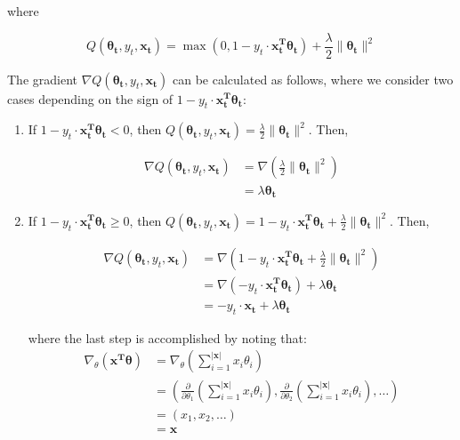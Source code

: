 \documentclass{article}
\renewcommand{\vec}[1]{\boldsymbol{#1}}
\newcommand{\pd}[2]{\frac{\partial#1}{\partial#2}}
\begin{document}
\begin{enumerate}[(a)]
where

\begin{equation}
Q(\vec{\theta_{t}}, y_t, \vec{x_t}) = \max(0, 1-y_t\cdot\vec{x_t^{T}}\vec{\theta_t}) + \frac{\lambda}{2}\|\vec{\theta_t}\|^2
\end{equation}

The gradient $\nabla Q(\vec{\theta_{t}}, y_t, \vec{x_t})$ can be calculated as follows, where we consider two cases depending on the sign of $1-y_t\cdot\vec{x_t^{T}}\vec{\theta_t}$:

\begin{enumerate}[1.]
\item If $1-y_t\cdot\vec{x_t^{T}}\vec{\theta_t} < 0$, then $Q(\vec{\theta_{t}}, y_t, \vec{x_t}) = \frac{\lambda}{2}\|\vec{\theta_t}\|^2$. Then,

\begin{align*}
\nabla Q(\vec{\theta_{t}}, y_t, \vec{x_t}) &= \nabla\left(\frac{\lambda}{2}\|\vec{\theta_t}\|^2\right)\\
&= \lambda \vec{\theta_t}
\end{align*}

\item If $1-y_t\cdot\vec{x_t^{T}}\vec{\theta_t} \geq 0$, then $Q(\vec{\theta_{t}}, y_t, \vec{x_t}) = 1-y_t\cdot\vec{x_t^{T}}\vec{\theta_t}+\frac{\lambda}{2}\|\vec{\theta_t}\|^2$. Then,

\begin{align*}
\nabla Q(\vec{\theta_{t}}, y_t, \vec{x_t}) &= \nabla\left(1-y_t\cdot\vec{x_t^{T}}\vec{\theta_t}+\frac{\lambda}{2}\|\vec{\theta_t}\|^2\right)\\
&= \nabla\left( -y_t\cdot\vec{x_t^{T}}\vec{\theta_t} \right) + \lambda \vec{\theta_t}\\
&= -y_t\cdot\vec{x_t} + \lambda\vec{\theta_t}
\end{align*}

where the last step is accomplished by noting that:
\begin{align*}
\nabla_{\theta}\left(\vec{x^{T}}\vec{\theta}\right) &= \nabla_{\theta}\left(\sum_{i=1}^{|\vec{x}|} x_i\theta_i\right)\\
&= \left( \pd{}{\theta_1}\left(\sum_{i=1}^{|\vec{x}|} x_i\theta_i\right), \pd{}{\theta_2}\left(\sum_{i=1}^{|\vec{x}|} x_i\theta_i\right), \ldots \right)\\
&= \left( x_1, x_2, \ldots \right)\\
&= \vec{x}
\end{align*}

\end{enumerate}


\end{enumerate}
\end{document}

